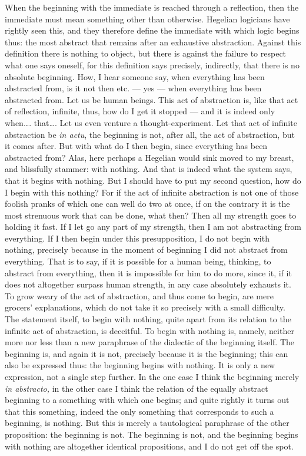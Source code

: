 \documentclass[12pt,a4paper,openany]{book}
\newcommand{\opage}[1]{\marginnote{\footnotesize\textit{[#1]}}}
\begin{document}
When the beginning with the immediate is reached through a reflection, then the
immediate must mean something other than otherwise. Hegelian logicians have rightly
seen this, and they therefore define the immediate with which logic begins thus: the
most abstract that remains after an exhaustive abstraction. Against this definition
there is nothing to object, but there is against the failure to respect what one says
oneself, for this definition says precisely, indirectly, that there is no absolute
beginning. How, I hear someone say, when everything has been abstracted from, is it
not then etc. --- yes --- when everything has been abstracted from. Let us be human
beings. This act of abstraction is, like that act of reflection, infinite, thus, how
do I get it stopped --- and it is indeed only when\dots{}. that\dots{}. Let us even
venture a thought-experiment. Let that act of infinite abstraction be \textit{in actu},
the beginning is not, after all, the act of abstraction, but it comes after. But with
what do I then begin, since everything has been abstracted from? Alas, here perhaps a
Hegelian would sink moved to my breast, and blissfully stammer: with nothing. And that
is indeed what the system says, that it begins with nothing. But I should have to put
my second question, how do I begin with this nothing? For if the act of infinite
abstraction is not one of those foolish pranks of which one can well do two at once,
if on the contrary it is the most strenuous work that can be done, what then? Then all
my strength goes to holding it fast. If I let go any part of my strength, then I am
not abstracting from everything. If I then begin under this presupposition, I do not
begin with nothing, precisely because in the moment of beginning I did not abstract
from everything. That is to say, if it is possible for a human being, thinking, to
abstract from everything, then it is impossible for him to do more, since it, if it
does not altogether surpass human strength, in any case absolutely exhausts
\setcounter{footnote}{0}%
\opage{176}it. To grow weary of the act of abstraction, and thus come to begin, are mere
grocers' explanations, which do not take it so precisely with a small difficulty. The
statement itself, to begin with nothing, quite apart from its relation to the infinite
act of abstraction, is deceitful. To begin with nothing is, namely, neither more nor
less than a new paraphrase of the dialectic of the beginning itself. The beginning is,
and again it is not, precisely because it is the beginning; this can also be expressed
thus: the beginning begins with nothing. It is only a new expression, not a single
step further. In the one case I think the beginning merely \textit{in abstracto,} in
the other case I think the relation of the equally abstract beginning to a something
with which one begins; and quite rightly it turns out that this something, indeed the
only something that corresponds to such a beginning, is nothing. But this is merely a
tautological paraphrase of the other proposition: the beginning is not. The beginning
is not, and the beginning begins with nothing are altogether identical propositions,
and I do not get off the spot.
\end{document}
